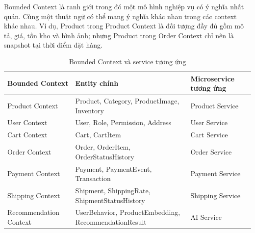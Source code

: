 \documentclass[../main.tex]{subfiles}
\begin{document}
Bounded Context là ranh giới trong đó một mô hình nghiệp vụ có ý nghĩa nhất quán. Cùng một thuật ngữ có thể mang ý nghĩa khác nhau trong các context khác nhau. Ví dụ, Product trong Product Context là đối tượng đầy đủ gồm mô tả, giá, tồn kho và hình ảnh; nhưng Product trong Order Context chỉ nên là snapshot tại thời điểm đặt hàng.

\begin{table}[H]
    \centering
    \caption{Bounded Context và service tương ứng}
    \label{tab:chapter2-bounded-contexts}
    \begin{tabular}{|p{}|p{}|p{}|}
        \hline
        \rowcolor{primary!35}
        \textbf{Bounded Context} & \textbf{Entity chính} & \textbf{Microservice tương ứng} \\
        \hline
        Product Context & Product, Category, ProductImage, Inventory & Product Service \\
        \hline
        User Context & User, Role, Permission, Address & User Service \\
        \hline
        Cart Context & Cart, CartItem & Cart Service \\
        \hline
        Order Context & Order, OrderItem, OrderStatusHistory & Order Service \\
        \hline
        Payment Context & Payment, PaymentEvent, Transaction & Payment Service \\
        \hline
        Shipping Context & Shipment, ShippingRate, ShipmentStatusHistory & Shipping Service \\
        \hline
        Recommendation Context & UserBehavior, ProductEmbedding, RecommendationResult & AI Service \\
        \hline
    \end{tabular}
\end{table}
\end{document}
